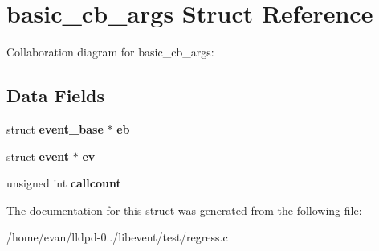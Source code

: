 \section{basic\-\_\-cb\-\_\-args \-Struct \-Reference}
\label{structbasic__cb__args}


\-Collaboration diagram for basic\-\_\-cb\-\_\-args\-:
\subsection*{\-Data \-Fields}
\begin{DoxyCompactItemize}
\item 
struct {\bf event\-\_\-base} $\ast$ {\bfseries eb}\label{structbasic__cb__args_a4f6d287699cb483f17a80e4e95522265}

\item 
struct {\bf event} $\ast$ {\bfseries ev}\label{structbasic__cb__args_a4439c6aa7b7e595b4b50a30968fb53cf}

\item 
unsigned int {\bfseries callcount}\label{structbasic__cb__args_a3766ef8f344573d1ee95dd981f545138}

\end{DoxyCompactItemize}


\-The documentation for this struct was generated from the following file\-:\begin{DoxyCompactItemize}
\item 
/home/evan/lldpd-\/0../libevent/test/regress.\-c\end{DoxyCompactItemize}
